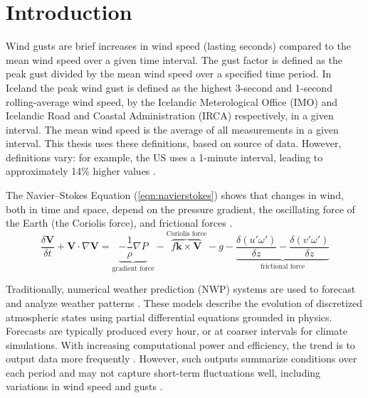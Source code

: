 
\chapter{Introduction} %

\label{Chapter1} %


\newcommand{\keyword}[1]{\textbf{#1}}
\newcommand{\tabhead}[1]{\textbf{#1}}
\newcommand{\code}[1]{\texttt{#1}}
\newcommand{\file}[1]{\texttt{\bfseries#1}}
\newcommand{\option}[1]{\texttt{\itshape#1}}

Wind gusts are brief increases in wind speed (lasting seconds) compared to the mean wind speed over a given time interval. The gust factor is defined as the peak gust divided by the mean wind speed over a specified time period. In Iceland the peak wind gust is defined as the highest 3-second and 1-second rolling-average wind speed, by the Icelandic Meterological Office (IMO) and Icelandic Road and Coastal Administration (IRCA) respectively, in a given interval. The mean wind speed is the average of all measurements in a given interval. This thesis uses these definitions, based on source of data. However, definitions vary: for example, the US uses a 1-minute interval, leading to approximately 14\% higher values \parencite{why_wind_gusts}.

The Navier–Stokes Equation (\ref{eqn:navierstokes}) shows that changes in wind, both in time and space, depend on the pressure gradient, the oscillating force of the Earth (the Coriolis force), and frictional forces \parencite{uncertainties_in_numerical_weather_predictions}.
\begin{equation}
    \label{eqn:navierstokes}
    \frac{\delta \mathbf{V}}{\delta t} + \mathbf{V}\cdot\nabla\mathbf{V} = \underbrace{-\frac{1}{\rho}\nabla P}_{\text{gradient force}} -\overbrace{ f\mathbf{k}\times\mathbf{V}}^{\text{Coriolis force}} - g - \underbrace{\frac{\delta(u'\omega')}{\delta z} - \frac{\delta(v'\omega')}{\delta z}}_{\text{frictional force}}
\end{equation}

Traditionally, numerical weather prediction (NWP) systems are used to forecast and analyze weather patterns \parencite{medium_range_3d_weather_forecasting_NN}. These models describe the evolution of discretized atmospheric states using partial differential equations grounded in physics. Forecasts are typically produced every hour, or at coarser intervals for climate simulations. With increasing computational power and efficiency, the trend is to output data more frequently \parencite{GNP_vidtal}. However, such outputs summarize conditions over each period and may not capture short-term fluctuations well, including variations in wind speed and gusts \parencite{canNNBeatNWP}.


